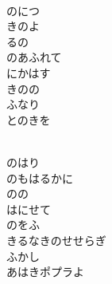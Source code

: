 \documentclass[10pt,b5j]{tarticle} %
\begin{document}
\vspace{1.5em} %
\newcommand{\linespace}{0.5em} %
\newcommand{\blocksize}{0.5\hsize} %
\newcommand{\itemmargin}{3em} %
\begin{enumerate} %
    \setlength{\itemindent}{\itemmargin} %
    \begin{minipage}[c]{\blocksize}
    
        \vspace{\linespace}
        \item~\\
        のにつ\\
        きのよ\\
        るの\\
        のあふれて\\
        にかはす\\
        きのの\\
        ふなり\\
        とのきを
        
    \end{minipage}
    \begin{minipage}[c]{\blocksize}
        
        \vspace{\linespace}
        \item~\\
        のはり\\
        のもはるかに\\
        のの\\
        はにせて\\
        のをふ\\
        きるなきのせせらぎ\\
        ふかし\\
        あはきポプラよ
        
    \end{minipage}
    \begin{minipage}[c]{\blocksize}
        

\end{minipage}
\end{enumerate}
\end{document}
